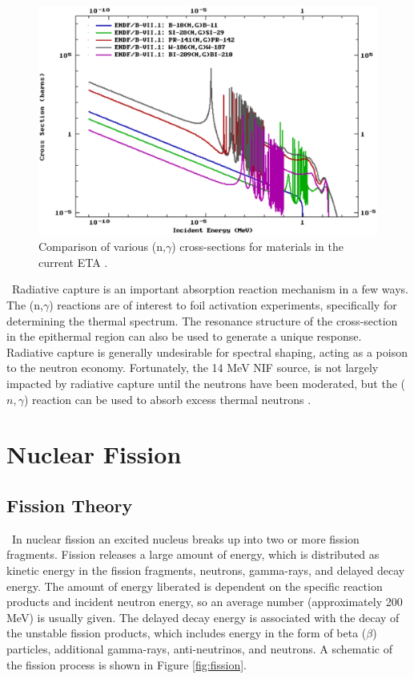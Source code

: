 \begin{figure}[ht]
	\includegraphics[width=\linewidth]{Figures/Chapter2/ngamma.png}
	\caption[Comparison of various (n,$\gamma$) cross-sections for materials in the current ETA.]{Comparison of various (n,$\gamma$) cross-sections for materials in the current ETA \cite{ENDF}.}
	\label{fig:ngamma}	
\end{figure}

\ Radiative capture is an important absorption reaction mechanism in a few ways. 
The (n,$\gamma$) reactions are of interest to foil activation experiments, specifically for determining the thermal spectrum. 
The resonance structure of the cross-section in the epithermal region can also be used to generate a unique response. 
Radiative capture is generally undesirable for spectral shaping, acting as a poison to the neutron economy. 
Fortunately, the 14 MeV NIF source, is not largely impacted by radiative capture until the neutrons have been moderated, but the ($n,\gamma$) reaction can be used to absorb excess thermal neutrons \cite{Bevins, Krane}. 

\section{Nuclear Fission}
\subsection{Fission Theory}
\ In nuclear fission an excited nucleus breaks up into two or more fission fragments. 
Fission releases a large amount of energy, which is distributed as kinetic energy in the fission fragments, neutrons, gamma-rays, and delayed decay energy. 
The amount of energy liberated is dependent on the specific reaction products and incident neutron energy, so an average number  (approximately 200 MeV) is usually given.
The delayed decay energy is associated with the decay of the unstable fission products, which includes energy in the form of beta ($\beta$) particles, additional gamma-rays, anti-neutrinos, and neutrons. 
A schematic of the fission process is shown in Figure \ref{fig:fission}.

